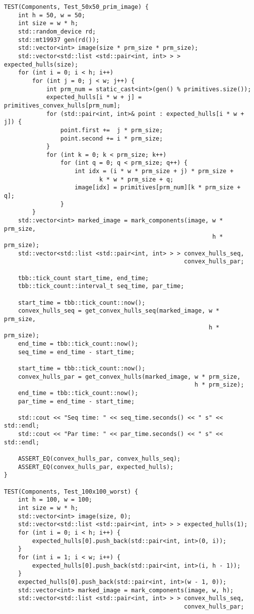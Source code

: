 \documentclass{report}
\begin{document}
\begin{lstlisting}
TEST(Components, Test_50x50_prim_image) {
    int h = 50, w = 50;
    int size = w * h;
    std::random_device rd;
    std::mt19937 gen(rd());
    std::vector<int> image(size * prm_size * prm_size);
    std::vector<std::list <std::pair<int, int> > > expected_hulls(size);
    for (int i = 0; i < h; i++)
        for (int j = 0; j < w; j++) {
            int prm_num = static_cast<int>(gen() % primitives.size());
            expected_hulls[i * w + j] = primitives_convex_hulls[prm_num];
            for (std::pair<int, int>& point : expected_hulls[i * w + j]) {
                point.first +=  j * prm_size;
                point.second += i * prm_size;
            }
            for (int k = 0; k < prm_size; k++)
                for (int q = 0; q < prm_size; q++) {
                    int idx = (i * w * prm_size + j) * prm_size +
                           k * w * prm_size + q;
                    image[idx] = primitives[prm_num][k * prm_size + q];
                }
        }
    std::vector<int> marked_image = mark_components(image, w * prm_size,
                                                           h * prm_size);
    std::vector<std::list <std::pair<int, int> > > convex_hulls_seq,
                                                   convex_hulls_par;

    tbb::tick_count start_time, end_time;
    tbb::tick_count::interval_t seq_time, par_time;

    start_time = tbb::tick_count::now();
    convex_hulls_seq = get_convex_hulls_seq(marked_image, w * prm_size,
                                                          h * prm_size);
    end_time = tbb::tick_count::now();
    seq_time = end_time - start_time;

    start_time = tbb::tick_count::now();
    convex_hulls_par = get_convex_hulls(marked_image, w * prm_size,
                                                      h * prm_size);
    end_time = tbb::tick_count::now();
    par_time = end_time - start_time;

    std::cout << "Seq time: " << seq_time.seconds() << " s" << std::endl;
    std::cout << "Par time: " << par_time.seconds() << " s" << std::endl;

    ASSERT_EQ(convex_hulls_par, convex_hulls_seq);
    ASSERT_EQ(convex_hulls_par, expected_hulls);
}

TEST(Components, Test_100x100_worst) {
    int h = 100, w = 100;
    int size = w * h;
    std::vector<int> image(size, 0);
    std::vector<std::list <std::pair<int, int> > > expected_hulls(1);
    for (int i = 0; i < h; i++) {
        expected_hulls[0].push_back(std::pair<int, int>(0, i));
    }
    for (int i = 1; i < w; i++) {
        expected_hulls[0].push_back(std::pair<int, int>(i, h - 1));
    }
    expected_hulls[0].push_back(std::pair<int, int>(w - 1, 0));
    std::vector<int> marked_image = mark_components(image, w, h);
    std::vector<std::list <std::pair<int, int> > > convex_hulls_seq,
                                                   convex_hulls_par;


\end{lstlisting}
\end{document}

